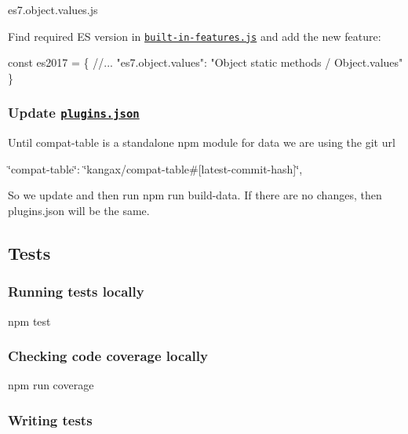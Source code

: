 {\ttfamily es7.\+object.\+values.\+js}

Find required ES version in \href{https://github.com/babel/babel-preset-env/blob/master/data/built-in-features.js}{\tt {\ttfamily built-\/in-\/features.\+js}} and add the new feature\+:


\begin{DoxyCode}
const es2017 = \{
  //...
  "es7.object.values": "Object static methods / Object.values"
\}
\end{DoxyCode}


\subsubsection*{Update \href{https://github.com/babel/babel-preset-env/blob/master/data/plugins.json}{\tt {\ttfamily plugins.\+json}}}

Until {\ttfamily compat-\/table} is a standalone npm module for data we are using the git url

{\ttfamily \char`\"{}compat-\/table\char`\"{}\+: \char`\"{}kangax/compat-\/table\#\mbox{[}latest-\/commit-\/hash\mbox{]}\char`\"{}},

So we update and then run {\ttfamily npm run build-\/data}. If there are no changes, then {\ttfamily plugins.\+json} will be the same.

\subsection*{Tests}

\subsubsection*{Running tests locally}


\begin{DoxyCode}
npm test
\end{DoxyCode}


\subsubsection*{Checking code coverage locally}


\begin{DoxyCode}
npm run coverage
\end{DoxyCode}


\subsubsection*{Writing tests}

